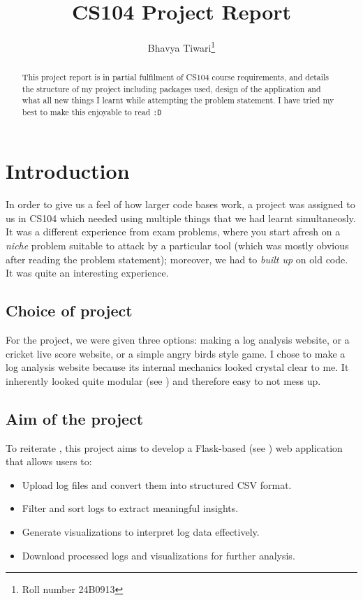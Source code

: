 \documentclass[11pt]{scrartcl}
\title{CS104 Project Report}
\author{Bhavya Tiwari\thanks{Roll number \textsc{24B0913}}}
\begin{document}
\maketitle
\begin{abstract}
  This project report is in partial fulfilment of \textsc{CS104} course requirements,
  and details the structure of my project including packages used, design of
  the application and what all new things I learnt while attempting the problem
  statement. I have tried my best to make this enjoyable to read \texttt{:D}
\end{abstract}
\tableofcontents

\newpage

\section{Introduction}

In order to give us a feel of how larger code bases work, a project was assigned
to us in \textsc{CS104} which needed using multiple things that we had learnt
simultaneosly. It was a different experience from exam problems, where you start
afresh on a \emph{niche} problem suitable to attack by a particular tool (which
was mostly obvious after reading the problem statement); moreover, we had to
\emph{built up} on old code. It was quite an interesting experience.

\subsection{Choice of project}

For the project, we were given three options: making a log analysis website, or
a cricket live score website, or a simple angry birds style game. I chose to
make a log analysis website because its internal mechanics looked crystal clear
to me. It inherently looked quite modular (see ) and
therefore easy to not mess up.

\subsection{Aim of the project}

To reiterate \cite{logfileprob}, this project aims to develop a Flask-based
(see \cite{flaskdocs}) web application that allows users to: 

\begin{itemize}
  \item Upload log files and convert them into structured CSV format.  
  \item Filter and sort logs to extract meaningful insights.
  \item Generate visualizations to interpret log data effectively.  
  \item Download processed logs and visualizations for further analysis.

\end{itemize}
\end{document}
